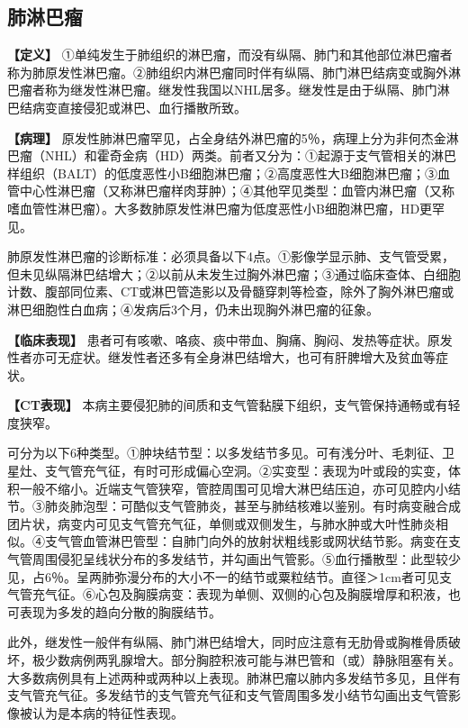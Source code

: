 \subsection{肺淋巴瘤}

\textbf{【定义】}
①单纯发生于肺组织的淋巴瘤，而没有纵隔、肺门和其他部位淋巴瘤者称为肺原发性淋巴瘤。②肺组织内淋巴瘤同时伴有纵隔、肺门淋巴结病变或胸外淋巴瘤者称为继发性淋巴瘤。继发性我国以NHL居多。继发性是由于纵隔、肺门淋巴结病变直接侵犯或淋巴、血行播散所致。

\textbf{【病理】}
原发性肺淋巴瘤罕见，占全身结外淋巴瘤的5％，病理上分为非何杰金淋巴瘤（NHL）和霍奇金病（HD）两类。前者又分为：①起源于支气管相关的淋巴样组织（BALT）的低度恶性小B细胞淋巴瘤；②高度恶性大B细胞淋巴瘤；③血管中心性淋巴瘤（又称淋巴瘤样肉芽肿）；④其他罕见类型：血管内淋巴瘤（又称嗜血管性淋巴瘤）。大多数肺原发性淋巴瘤为低度恶性小B细胞淋巴瘤，HD更罕见。

肺原发性淋巴瘤的诊断标准：必须具备以下4点。①影像学显示肺、支气管受累，但未见纵隔淋巴结增大；②以前从未发生过胸外淋巴瘤；③通过临床查体、白细胞计数、腹部同位素、CT或淋巴管造影以及骨髓穿刺等检查，除外了胸外淋巴瘤或淋巴细胞性白血病；④发病后3个月，仍未出现胸外淋巴瘤的征象。

\textbf{【临床表现】}
患者可有咳嗽、咯痰、痰中带血、胸痛、胸闷、发热等症状。原发性者亦可无症状。继发性者还多有全身淋巴结增大，也可有肝脾增大及贫血等症状。

\textbf{【CT表现】}
本病主要侵犯肺的间质和支气管黏膜下组织，支气管保持通畅或有轻度狭窄。

可分为以下6种类型。①肿块结节型：以多发结节多见。可有浅分叶、毛刺征、卫星灶、支气管充气征，有时可形成偏心空洞。②实变型：表现为叶或段的实变，体积一般不缩小。近端支气管狭窄，管腔周围可见增大淋巴结压迫，亦可见腔内小结节。③肺炎肺泡型：可酷似支气管肺炎，甚至与肺结核难以鉴别。有时病变融合成团片状，病变内可见支气管充气征，单侧或双侧发生，与肺水肿或大叶性肺炎相似。④支气管血管淋巴管型：自肺门向外的放射状粗线影或网状结节影。病变在支气管周围侵犯呈线状分布的多发结节，并勾画出气管影。⑤血行播散型：此型较少见，占6％。呈两肺弥漫分布的大小不一的结节或粟粒结节。直径＞1cm者可见支气管充气征。⑥心包及胸膜病变：表现为单侧、双侧的心包及胸膜增厚和积液，也可表现为多发的趋向分散的胸膜结节。

此外，继发性一般伴有纵隔、肺门淋巴结增大，同时应注意有无肋骨或胸椎骨质破坏，极少数病例两乳腺增大。部分胸腔积液可能与淋巴管和（或）静脉阻塞有关。大多数病例具有上述两种或两种以上表现。肺淋巴瘤以肺内多发结节多见，且伴有支气管充气征。多发结节的支气管充气征和支气管周围多发小结节勾画出支气管影像被认为是本病的特征性表现。

